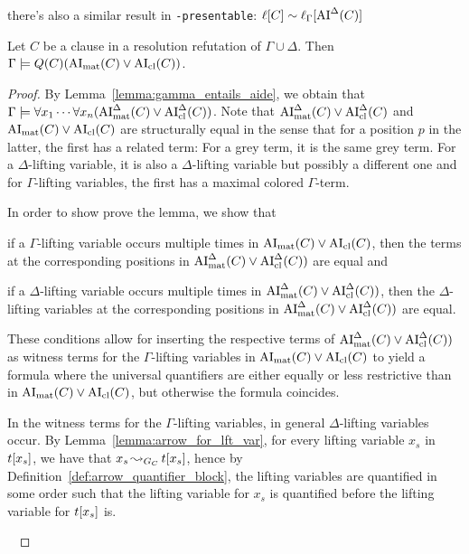 \documentclass[,%
	draft=false,%
	numbers=noendperiod
	11pt,
	a4paper,
	oneside,%
	openany,
]{memoir}
\begin{document}

there's also a similar result in \texttt{-presentable}: $\ell[C] \sim \ell_{\Gamma}[ \operatorname{AI}^\Delta(C) ] $

\begin{clemma}
	\label{lemma:gamma_entails_quantified_ai}
	Let $C$ be a clause in a resolution refutation of $\Gamma\cup\Delta$.
	Then
	$\Gamma \entails\nolinebreak Q(C) ( \AImat(C) \lor\nolinebreak \AIcl(C))$.
\end{clemma}
\begin{proof}
	By Lemma~\ref{lemma:gamma_entails_aide}, we obtain that 
	$\Gamma \models \forall x_1 \cdots \forall x_n (\operatorname{AI}_\mathrm{mat}^\Delta(C) \lor \operatorname{AI}_\mathrm{cl}^\Delta(C))$.
	Note that $\operatorname{AI}_\mathrm{mat}^\Delta(C) \lor \operatorname{AI}_\mathrm{cl}^\Delta(C)$ and $\AImat(C) \lor\nolinebreak \AIcl(C)$ are structurally equal in the sense that for a position $p$ in the latter, the first has a related term: For a grey term, it is the same grey term. For a $\Delta$-lifting variable, it is also a $\Delta$-lifting variable but possibly a different one and for $\Gamma$-lifting variables, the first has a maximal colored $\Gamma$-term.

	In order to show prove the lemma, we show that
	\begin{compactenum}
	\item if a $\Gamma$-lifting variable occurs multiple times in $\operatorname{AI}_\mathrm{mat}(C)\lor\operatorname{AI}_\mathrm{cl}(C)$, then the terms at the corresponding positions in $\operatorname{AI}_\mathrm{mat}^\Delta(C) \lor \operatorname{AI}_\mathrm{cl}^\Delta(C))$ are equal and 
	\item if a $\Delta$-lifting variable occurs multiple times in $\operatorname{AI}_\mathrm{mat}^\Delta(C) \lor \operatorname{AI}_\mathrm{cl}^\Delta(C))$, then the $\Delta$-lifting variables at the corresponding positions in $\operatorname{AI}_\mathrm{mat}^\Delta(C) \lor \operatorname{AI}_\mathrm{cl}^\Delta(C))$ are equal.
	\end{compactenum}
	These conditions allow for inserting the respective terms of $\operatorname{AI}_\mathrm{mat}^\Delta(C) \lor \operatorname{AI}_\mathrm{cl}^\Delta(C))$ as witness terms for the $\Gamma$-lifting variables in $\operatorname{AI}_\mathrm{mat}(C)\lor\operatorname{AI}_\mathrm{cl}(C)$ to yield a formula where the universal quantifiers are either equally or less restrictive than in $\operatorname{AI}_\mathrm{mat}(C)\lor\operatorname{AI}_\mathrm{cl}(C)$, but otherwise the formula coincides.

	In the witness terms for the $\Gamma$-lifting variables, in general $\Delta$-lifting variables occur. 
	By Lemma~\ref{lemma:arrow_for_lft_var}, for every lifting variable $x_s$ in $t[x_s]$, we have that $x_s \operatorname{\leadsto}_{G_C} t[x_s]$, hence by Definition~\ref{def:arrow_quantifier_block}, the lifting variables are quantified in some order such that the lifting variable for $x_s$ is quantified before the lifting variable for $t[x_s]$ is.

	~


\end{proof}
\end{document}
